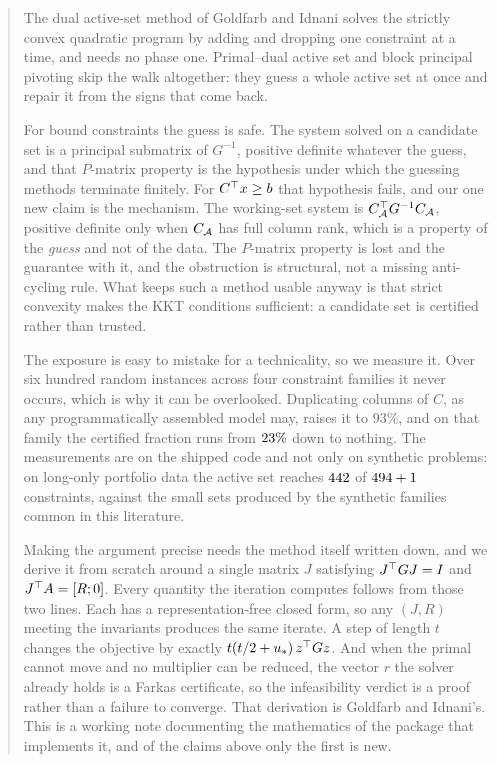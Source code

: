 \begin{abstract}
\noindent
The dual active-set method of Goldfarb and Idnani solves the strictly convex
quadratic program by adding and dropping one constraint at a time, and needs no
phase one. Primal--dual active set and block principal pivoting skip the walk
altogether: they guess a whole active set at once and repair it from the signs
that come back.

For bound constraints the guess is safe. The system solved on a candidate set is
a principal submatrix of $G^{-1}$, positive definite whatever the guess, and that
$P$-matrix property is the hypothesis under which the guessing methods terminate
finitely. For $C\T x \ge b$ that hypothesis fails, and our one new claim is the
mechanism. The working-set system is
$C_\Active\T G^{-1} C_\Active$, positive definite only when $C_\Active$ has full
column rank, which is a property of the \emph{guess} and not of the data. The
$P$-matrix property is lost and the guarantee with it, and the obstruction is
structural, not a missing anti-cycling rule. What keeps such a method usable
anyway is that strict convexity makes the KKT conditions sufficient: a candidate
set is certified rather than trusted.

The exposure is easy to mistake for a technicality, so we measure it. Over six
hundred random instances across four constraint families it never occurs, which
is why it can be overlooked. Duplicating columns of $C$, as any programmatically
assembled model may, raises it to $93\%$, and on that family the certified
fraction runs from $\qpPdasCertSmall\%$ down to nothing. The measurements are on
the shipped code and not only on
synthetic problems: on long-only portfolio data the active set reaches
$\qpPfSpActive{}$ of $\qpPfSpN{}+1$ constraints, against the small sets produced
by the synthetic families common in this literature.

Making the argument precise needs the method itself written down, and we derive
it from scratch around a single matrix $J$ satisfying $J\T G J = I$ and
$J\T A = [R;0]$. Every quantity the iteration computes follows from those two
lines. Each has a representation-free closed form, so any $(J,R)$ meeting the
invariants produces the same iterate. A step of length $t$ changes the objective
by exactly $t(t/2 + u_*)\,z\T G z$. And when the primal cannot move and no
multiplier can be reduced, the vector $r$ the solver already holds is a Farkas
certificate, so the infeasibility verdict is a proof rather than a failure to
converge. That derivation is Goldfarb and Idnani's. This is a working note
documenting the mathematics of the package that implements it, and of the claims
above only the first is new.
\end{abstract}
